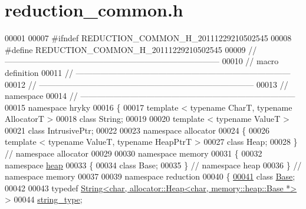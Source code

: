 \hypertarget{reduction__common_8h_source}{\section{reduction\-\_\-common.\-h}
}

\begin{DoxyCode}
00001 
00007 \textcolor{preprocessor}{#ifndef REDUCTION\_COMMON\_H\_20111229210502545}
00008 \textcolor{preprocessor}{}\textcolor{preprocessor}{#define REDUCTION\_COMMON\_H\_20111229210502545}
00009 \textcolor{preprocessor}{}\textcolor{comment}{//
      ------------------------------------------------------------------------------}
00010 \textcolor{comment}{// macro definition}
00011 \textcolor{comment}{//
      ------------------------------------------------------------------------------}
00012 \textcolor{comment}{//
      ------------------------------------------------------------------------------}
00013 \textcolor{comment}{// namespace}
00014 \textcolor{comment}{//
      ------------------------------------------------------------------------------}
00015 \textcolor{keyword}{namespace }hryky
00016 \{
00017     \textcolor{keyword}{template} < \textcolor{keyword}{typename} CharT, \textcolor{keyword}{typename} AllocatorT >
00018     \textcolor{keyword}{class }String;
00019 
00020     \textcolor{keyword}{template} < \textcolor{keyword}{typename} ValueT >
00021     \textcolor{keyword}{class }IntrusivePtr;
00022 
00023 \textcolor{keyword}{namespace }allocator
00024 \{
00026     \textcolor{keyword}{template} < \textcolor{keyword}{typename} ValueT, \textcolor{keyword}{typename} HeapPtrT >
00027     \textcolor{keyword}{class }Heap;
00028 \} \textcolor{comment}{// namespace allocator}
00029 
00030 \textcolor{keyword}{namespace }memory
00031 \{
00032 \textcolor{keyword}{namespace }\hyperlink{namespacehryky_1_1memory_1_1global_a6fc6103f67c837aa0f39b359588409cd}{heap}
00033 \{
00034     \textcolor{keyword}{class }Base;
00035 \} \textcolor{comment}{// namespace heap}
00036 \} \textcolor{comment}{// namespace memory}
00037 
00039 \textcolor{keyword}{namespace }reduction
00040 \{
\hypertarget{reduction__common_8h_source_l00041}{}\hyperlink{namespacehryky_1_1reduction_a4314fd3d5c8dd6a515a10de4861a998f}{00041}     \textcolor{keyword}{class }\hyperlink{classhryky_1_1reduction_1_1_base}{Base};
00042 
00043     \textcolor{keyword}{typedef} \hyperlink{classhryky_1_1reduction_1_1_string}{String<char, allocator::Heap<char, memory::heap::Base *>} >
00044         \hyperlink{namespacehryky_1_1reduction_a4314fd3d5c8dd6a515a10de4861a998f}{string_type};

\end{DoxyCode}
